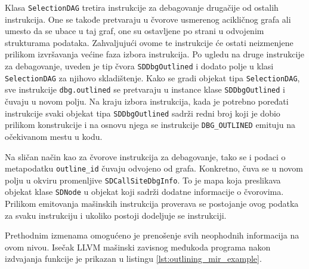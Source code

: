 \documentclass[12pt,oneside]{memoir}
\begin{document}
Klasa \verb|SelectionDAG| tretira instrukcije za debagovanje drugačije od ostalih instrukcija. 
One se takođe pretvaraju u čvorove usmerenog acikličnog grafa ali umesto da se ubace u taj graf, one su ostavljene po strani u odvojenim strukturama podataka. %
Zahvaljujući ovome te instrukcije će ostati neizmenjene prilikom izvršavanja većine faza izbora instrukcija.
Po ugledu na druge instrukcije za debagovanje, uveden je tip čvora \verb|SDDbgOutlined| i dodato polje u klasi \verb|SelectionDAG| za njihovo skladištenje.
Kako se gradi objekat tipa \verb|SelectionDAG|, sve instrukcije \verb|dbg.outlined| se pretvaraju u instance klase \verb|SDDbgOutlined| i čuvaju u novom polju.
Na kraju izbora instrukcija, kada je potrebno poređati instrukcije svaki objekat tipa \verb|SDDbgOutlined| sadrži redni broj koji je dobio prilikom konstrukcije i na osnovu njega se instrukcije \verb|DBG_OUTLINED| emituju na očekivanom mestu u kodu.

Na sličan način kao za čvorove instrukcija za debagovanje, tako se i podaci o metapodatku \verb|outline_id| čuvaju odvojeno od grafa.
Konkretno, čuva se u novom polju u okviru promenljive \verb|SDCallSiteDbgInfo|. %
To je mapa koja preslikava objekat klase \verb|SDNode| u objekat koji sadrži dodatne informacije o čvorovima.
Prilikom emitovanja mašinskih instrukcija proverava se postojanje ovog podatka za svaku instrukciju i ukoliko postoji dodeljuje se instrukciji.


Prethodnim izmenama omogućeno je prenošenje svih neophodnih informacija na ovom nivou.
Isečak LLVM mašinski zavisnog međukoda programa nakon izdvajanja funkcije je prikazan u listingu \ref{lst:outlining_mir_example}.
\end{document}
